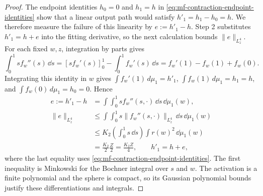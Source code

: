 \begin{proof}
The endpoint identities \(h_0=0\) and \(h_1=h\) in
\cref{eq:mf-contraction-endpoint-identities} show that a linear output path
would satisfy \(h'_1=h_1-h_0=h\).  We therefore measure the failure of this
linearity by \(e:=h'_1-h\).  Step 2 substitutes \(h'_1=h+e\) into the
fitting derivative, so the next calculation bounds \(\|e\|_{L^4_z}\).
For each fixed \(w,z\), integration by parts gives
\[
 \int_0^1s f_w''(s)\,\dd s
 =[s f_w'(s)]_0^1-\int_0^1f_w'(s)\,\dd s
 =f_w'(1)-f_w(1)+f_w(0).
\]
Integrating this identity in \(w\) gives
\(\int f_w'(1)\,d\mu_1=h'_1\),
\(\int f_w(1)\,d\mu_1=h_1=h\), and
\(\int f_w(0)\,d\mu_1=h_0=0\).  Hence
\begin{equation}
\label{eq:mf-contraction-feature-remainder}
\begin{aligned}
 e:=h'_1-h
 &=\int\!\int_0^1s f_w''(s,\cdot)\,\dd s\,\dd\mu_1(w),\\
 \|e\|_{L^4_z}
 &\le\int\!\int_0^1s\|f_w''(s,\cdot)\|_{L^4_z}\,\dd s\,\dd\mu_1(w)\\
 &\le K_2\left(\int_0^1s\,\dd s\right)\int r(w)^2\,\dd\mu_1(w)\\
 &=\frac{K_2}{2}\frac Z2=\frac{K_2Z}{4},
 \qquad h'_1=h+e,
\end{aligned}
\end{equation}
where the last equality uses
\cref{eq:mf-contraction-endpoint-identities}.  The first inequality is
Minkowski for the Bochner integral over \(s\) and \(w\).
The activation is a finite polynomial and the sphere is compact, so its
Gaussian polynomial bounds justify these differentiations and integrals.


\end{proof}
